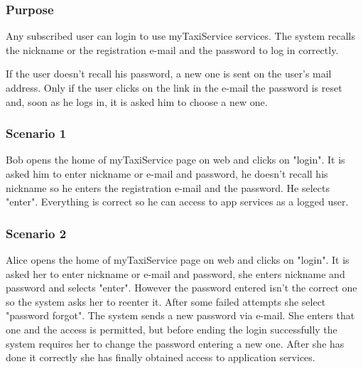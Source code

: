 \label{user-login}
\subsubsection{Purpose}
Any subscribed user can login to use myTaxiService services.
The system recalls the nickname or the registration e-mail and the password to log in correctly.

If the user doesn't recall his password, a new one is sent on the user's mail address. Only if the user clicks on the link in the e-mail the password is reset and, soon as he logs in, it is asked him to choose a new one. 

\subsubsection{Scenario 1}
Bob opens the home of myTaxiService page on web and clicks on "login". 
It is asked him to enter nickname or e-mail and password, he doesn't recall his nickname so he enters the registration e-mail and the password. He selects "enter". 
Everything is correct so he can access to app services as a logged user.

\subsubsection{Scenario 2}
Alice opens the home of myTaxiService page on web and clicks on "login".  
It is asked her to enter nickname or e-mail and password, she enters nickname and password and selects "enter". However the password entered isn't the correct one so the system asks her to reenter it. 
After some failed attempts she select "password forgot". 
The system sends a new password via e-mail. She enters that one and the access is permitted, but before ending the login successfully the system requires her to change the password entering a new one. 
After she has done it correctly she has finally obtained access to application services.


